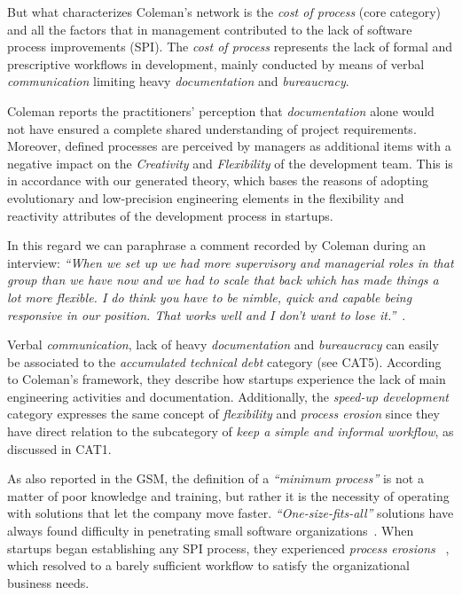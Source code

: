 \documentclass[10pt,journal,letterpaper,compsoc]{IEEEtran}
\begin{document}
But what characterizes Coleman's network is the \textit{cost of process} (core
category) and all the factors that in management contributed to the lack of
software process improvements (SPI). The \textit{cost of process} represents the
lack of formal and prescriptive workflows in development, mainly conducted by
means of verbal \textit{communication} limiting heavy \textit{documentation} and
\textit{bureaucracy}.

Coleman reports the practitioners' perception that \textit{documentation} alone
would not have ensured a complete shared understanding of project requirements.
Moreover, defined processes are perceived by managers as additional items with a
negative impact on the \textit{Creativity} and \textit{Flexibility} of the
development team. This is in accordance with our generated theory, which bases
the reasons of adopting evolutionary and low-precision engineering elements in
the flexibility and reactivity attributes of the development process in
startups.

In this regard we can paraphrase a comment recorded by Coleman during an
interview: \textit{``When we set up we had more supervisory and managerial roles
in that group than we have now and we had to scale that back which has made
things a lot more flexible. I do think you have to be nimble, quick and capable
being responsive in our position. That works well and I don't want to lose
it.''}~\cite{Coleman2007}.

Verbal \textit{communication}, lack of heavy \textit{documentation} and
\textit{bureaucracy} can easily be associated to the \textit{accumulated
technical debt} category (see CAT5). According to Coleman's framework, they
describe how startups experience the lack of main engineering activities and
documentation. Additionally, the \textit{speed-up development} category
expresses the same concept of \textit{flexibility} and \textit{process erosion}
since they have direct relation to the subcategory of \textit{keep a simple and
informal workflow}, as discussed in CAT1.

As also reported in the GSM, the definition of a \textit{``minimum process''}
is not a matter of poor knowledge and training, but rather it is the necessity
of operating with solutions that let the company move faster. 
\textit{``One-size-fits-all''} solutions have always found difficulty in 
penetrating small software organizations~\cite{Staples2007}. When startups 
began establishing any SPI process, they experienced \textit{process 
erosions}~\cite{Coleman2008}
, which resolved to a barely sufficient workflow to satisfy the organizational 
business needs.
\end{document}
